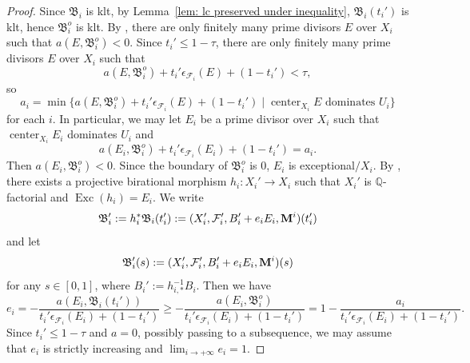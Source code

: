 \documentclass[11pt,reqno]{amsart}
\numberwithin{equation}{section}
\newcommand{\Mm}{{\bf{M}}}
\newcommand{\Center}{\operatorname{center}}
\newcommand{\Exc}{\operatorname{Exc}}
\newcommand{\Bb}{{\mathfrak{B}}}
\newcommand{\Ff}{\mathcal{F}}
\theoremstyle{definition}
\begin{document}
\begin{proof}
Since $\Bb_i$ is klt, by Lemma~\ref{lem: lc preserved under inequality}, $\Bb_i(t_i')$ is klt, hence $\Bb_i^o$ is klt. By \cite[Lemma~2.13]{CLW26}, there are only finitely many prime divisors $E$ over $X_i$ such that $a(E,\Bb_i^o)<0$. Since $t_i'\leq 1-\tau$, there are only finitely many prime divisors $E$ over $X_i$ such that
$$a(E,\Bb_i^o)+t_i'\epsilon_{\Ff_i}(E)+(1-t_i')<\tau,$$
so
$$a_i=\min\{a(E,\Bb_i^o)+t_i'\epsilon_{\Ff_i}(E)+(1-t_i')\mid\Center_{X_i}E\text{ dominates }U_i\}$$ 
for each $i$. In particular, we may let $E_i$ be a prime divisor over $X_i$ such that $\Center_{X_i}E_i$ dominates $U_i$ and 
$$a(E_i,\Bb_i^o)+t_i'\epsilon_{\Ff_i}(E_i)+(1-t_i')=a_i.$$
Then $a(E_i,\Bb_i^o)<0$. Since the boundary of $\Bb_i^o$ is $0$, $E_i$ is exceptional$/X_i$. By \cite[Theorem~2.2.3]{Cas+25a}, there exists a projective birational morphism $h_i: X_i'\rightarrow X_i$ such that $X_i'$ is $\mathbb Q$-factorial and $\Exc(h_i)=E_i$. We write
$$\Bb_i':=h_i^*\Bb_i(t_i'):=(X_i',\Ff_i',B_i'+e_iE_i,\Mm^i)(t_i')$$
and let 
$$\Bb_i'(s):=(X_i',\Ff_i',B_i'+e_iE_i,\Mm^i)(s)$$
for any $s\in [0,1]$, where $B_i':=h^{-1}_{i,*}B_i$. Then we have
$$e_i=-\frac{a(E_i,\Bb_i(t_i'))}{t_i'\epsilon_{\Ff_i}(E_i)+(1-t_i')}\geq -\frac{a(E_i,\Bb_i^o)}{t_i'\epsilon_{\Ff_i}(E_i)+(1-t_i')}=1-\frac{a_i}{t_i'\epsilon_{\Ff_i}(E_i)+(1-t_i')}.$$
Since $t_i'\leq 1-\tau$ and $a=0$, possibly passing to a subsequence, we may assume that $e_i$ is strictly increasing and $\lim_{i\rightarrow+\infty}e_i=1$.


\end{proof}
\end{document}
